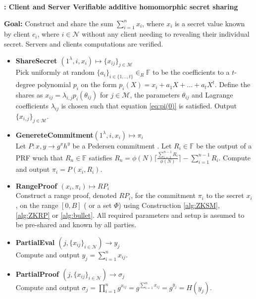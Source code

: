 \begin{algorithm}
\caption{\textbf{: Client and Server Verifiable additive homomorphic secret sharing}}

\textbf{Goal:} Construct and share the sum $\sum_{i=1}^n x_i$, where $x_i$ is a secret value known by client $c_i$, where $i\in\mathcal{N}$ without any client needing to revealing their individual secret. Servers and clients computations are verified. 
\vspace{2pt}
\hline
\vspace{2pt}
\begin{itemize}
 \item\textbf{ShareSecret $(1^\lambda,i,x_i) \mapsto \{x_{ij}\}_{j\in\mathcal{M}}$} \\
Pick uniformly at random $\{a_i\}_{i\in\{1,..,t\}}\in_R\mathds{F}$ to be the coefficients to a $t$-degree polynomial $p_i$ on the form $p_i(X) = x_i + a_1X+...+a_tX^t$. Define  the shares as $x_{ij}=\lambda_{i,j}p_i(\theta_{ij})$ for $j\in\mathcal{M}$, the parameters $\theta_{ij}$ and Lagrange coefficients $\lambda_{ij}$ is chosen such that equation \ref{eq:pi(0)} is satisfied.
Output $\{x_{i,j}\}_{j\in\mathcal{M}}$.

\item\textbf{GenereteCommitment$(1^\lambda,i,x_i) \mapsto \pi_i$ }\\
Let $P : x,y \to g^xh^y$ be a Pedersen commitment . Let $R_i\in\mathds{F}$ be the output of a PRF wuch that $R_n\in \mathds{F}$  satisfies $R_n = \phi(N)\lceil \frac{\sum_{i=1}^{n-1}R_i}{\phi(N)}\rceil- \sum_{i=1}^{n-1}R_i $. Compute and output $\pi_i = P(x_i,R_i)$.

\item\textbf{RangeProof $(x_i,\pi_i) \mapsto RP_i$}\\
Construct a range proof, denoted $RP_i$, for the commitment $\pi_i$ to the secret $x_i$, on the  range $[0,B]$ ( or a set $\Phi$) using Construction \ref{alg:ZKSM}, \ref{alg:ZKRP} or \ref{alg:bullet}. All required  parameters and setup is assumed to be pre-shared and known by all parties.
\item\textbf{PartialEval $(j,\{x_{ij}\}_{i\in\mathcal{N}})\xrightarrow[]{}y_j$}\\
Compute and output $y_j = \sum_{i=1}^n x_{ij}$.

\item\textbf{PartialProof $(j,\{x_{ij}\}_{i\in\mathcal{N}})\xrightarrow[]{}\sigma_j$}\\
Compute and output $\sigma_j = \prod_{i=1}^n g^{x_{ij}} =  g^{\sum_{i=1}^n x_{ij}}= g^{y_j}=H(y_j)$.


\end{itemize}
\end{algorithm}
